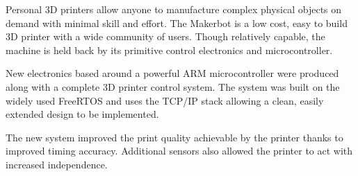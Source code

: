 Personal 3D printers allow anyone to manufacture complex physical objects on
demand with minimal skill and effort. The Makerbot is a low cost, easy to build
3D printer with a wide community of users. Though relatively capable, the
machine is held back by its primitive control electronics and microcontroller.

New electronics based around a powerful ARM microcontroller were produced
along with a complete 3D printer control system. The system was built on
the widely used FreeRTOS and uses the \uIP{} TCP/IP stack allowing a clean,
easily extended design to be implemented.

The new system improved the print quality achievable by the printer thanks to
improved timing accuracy. Additional sensors also allowed the printer to act
with increased independence.
